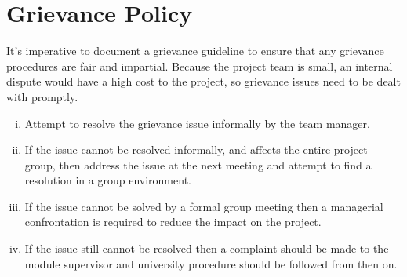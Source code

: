 \section{Grievance Policy}
It's imperative to document a grievance guideline to ensure that any grievance procedures are fair and impartial. %
 Because the project team is small, an internal dispute would have a high cost to the project, so grievance issues need to be dealt with promptly. 
  
\begin{enumerate}[i)]
    \item{Attempt to resolve the grievance issue informally by the team manager.}
    \item{If the issue cannot be resolved informally, and affects the entire project group, then address the issue at the next meeting and attempt to find a resolution in a group environment.}
    \item{If the issue cannot be solved by a formal group meeting then a managerial confrontation is required to reduce the impact on the project.}
    \item{If the issue still cannot be resolved then a complaint should be made to the module supervisor and university procedure should be followed from then on.}
\end{enumerate}
